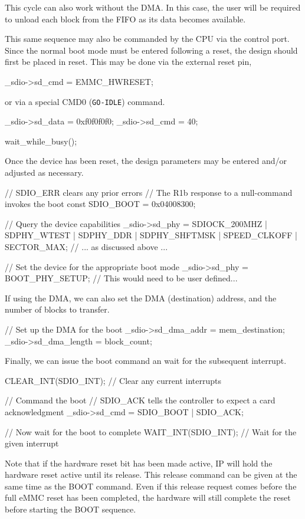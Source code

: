 \documentclass{gqtekspec}
\begin{document}
This cycle can also work without the DMA.  In this case, the user will be
required to unload each block from the FIFO as its data becomes available.

This same sequence may also be commanded by the CPU via the control port.
Since the normal boot mode must be entered following a reset, the design should
first be placed in reset.  This may be done via the external reset pin,
\begin{zCpp}
	_sdio->sd_cmd = EMMC_HWRESET;
\end{zCpp}
or via a special CMD0 ({\tt GO-IDLE}) command.
\begin{zCpp}
	_sdio->sd_data = 0xf0f0f0f0;
	_sdio->sd_cmd  = 40;

	wait_while_busy();
\end{zCpp}
Once the device has been reset, the design parameters may be entered and/or
adjusted as necessary.
\begin{zCpp}
	//	SDIO_ERR clears any prior errors
	//	The R1b response to a null-command invokes the boot
	const	SDIO_BOOT    = 0x04008300;

	// Query the device capabilities
	_sdio->sd_phy = SDIOCK_200MHZ | SDPHY_WTEST | SDPHY_DDR
			| SDPHY_SHFTMSK | SPEED_CLKOFF | SECTOR_MAX;
	// ... as discussed above ...

	// Set the device for the appropriate boot mode
	_sdio->sd_phy = BOOT_PHY_SETUP;	// This would need to be user defined...
\end{zCpp}
If using the DMA, we can also set the DMA (destination) address, and the number
of blocks to transfer.
\begin{zCpp}
	// Set up the DMA for the boot
	_sdio->sd_dma_addr   = mem_destination;
	_sdio->sd_dma_length = block_count;
\end{zCpp}
Finally, we can issue the boot command an wait for the subsequent interrupt.
\begin{zCpp}
	CLEAR_INT(SDIO_INT);	// Clear any current interrupts

	// Command the boot
	//	SDIO_ACK tells the controller to expect a card acknowledgment
	_sdio->sd_cmd = SDIO_BOOT | SDIO_ACK;

	// Now wait for the boot to complete
	WAIT_INT(SDIO_INT);	// Wait for the given interrupt
\end{zCpp}
Note that if the hardware reset bit has been made active, IP will hold the
hardware reset active until its release.  This release command can be given at
the same time as the BOOT command.  Even if this release request comes before
the full eMMC reset has been completed, the hardware will still complete the
reset before starting the BOOT sequence.
\end{document}

